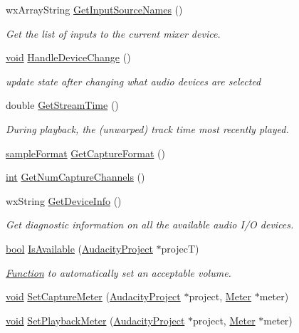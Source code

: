 \begin{DoxyCompactItemize}
wx\+Array\+String \hyperlink{class_audio_i_o_a871ad77e029d77ff4ae461b2be5325cd}{Get\+Input\+Source\+Names} ()
\begin{DoxyCompactList}\small\item\em Get the list of inputs to the current mixer device. \end{DoxyCompactList}\item 
\hyperlink{sound_8c_ae35f5844602719cf66324f4de2a658b3}{void} \hyperlink{class_audio_i_o_aef42a8e615a55e2b914a989e8b63af0b}{Handle\+Device\+Change} ()
\begin{DoxyCompactList}\small\item\em update state after changing what audio devices are selected \end{DoxyCompactList}\item 
double \hyperlink{class_audio_i_o_adaf7977e341e8012b03dca8c733f24e1}{Get\+Stream\+Time} ()
\begin{DoxyCompactList}\small\item\em During playback, the (unwarped) track time most recently played. \end{DoxyCompactList}\item 
\hyperlink{include_2audacity_2_types_8h_a9938d2e2f6adef23e745cd80ef379792}{sample\+Format} \hyperlink{class_audio_i_o_a5735d00a230e2a59a9702dfbf1a8b85d}{Get\+Capture\+Format} ()
\item 
\hyperlink{xmltok_8h_a5a0d4a5641ce434f1d23533f2b2e6653}{int} \hyperlink{class_audio_i_o_a841f37644672ecb5ea445bfb52907c1f}{Get\+Num\+Capture\+Channels} ()
\item 
wx\+String \hyperlink{class_audio_i_o_a134b6a56921f9c6bd197d80de4ddce48}{Get\+Device\+Info} ()
\begin{DoxyCompactList}\small\item\em Get diagnostic information on all the available audio I/O devices. \end{DoxyCompactList}\item 
\hyperlink{mac_2config_2i386_2lib-src_2libsoxr_2soxr-config_8h_abb452686968e48b67397da5f97445f5b}{bool} \hyperlink{class_audio_i_o_a7735a1b6d723e8342d22f9ddcf61d8e6}{Is\+Available} (\hyperlink{class_audacity_project}{Audacity\+Project} $\ast$projecT)
\begin{DoxyCompactList}\small\item\em \hyperlink{class_function}{Function} to automatically set an acceptable volume. \end{DoxyCompactList}\item 
\hyperlink{sound_8c_ae35f5844602719cf66324f4de2a658b3}{void} \hyperlink{class_audio_i_o_a0ef8578b176133229c30a656fe41478e}{Set\+Capture\+Meter} (\hyperlink{class_audacity_project}{Audacity\+Project} $\ast$project, \hyperlink{class_meter}{Meter} $\ast$meter)
\item 
\hyperlink{sound_8c_ae35f5844602719cf66324f4de2a658b3}{void} \hyperlink{class_audio_i_o_a615aec62315405636bfe8b6e2a326cbe}{Set\+Playback\+Meter} (\hyperlink{class_audacity_project}{Audacity\+Project} $\ast$project, \hyperlink{class_meter}{Meter} $\ast$meter)
\end{DoxyCompactItemize}
